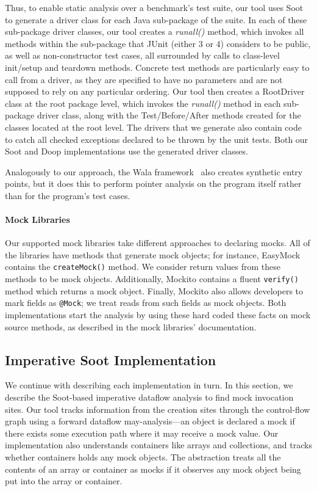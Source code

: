 Thus, to enable static analysis over a benchmark's test suite, our tool uses Soot to generate a driver class for each Java sub-package of the suite. In each of these sub-package driver classes, our tool creates a \textit{runall()} method, which invokes all methods within the sub-package that JUnit (either 3 or 4) considers to be public, as well as non-constructor test cases, all surrounded by calls to class-level init/setup and teardown methods. Concrete test methods are particularly easy to call from a driver, as they are specified to have no parameters and are not supposed to rely on any particular ordering. 
Our tool then creates a RootDriver class at the root package level, which invokes the \textit{runall()} method in each sub-package driver class, along with the Test/Before/After methods created for the classes located at the root level. The drivers that we generate also contain code to catch all checked exceptions declared to be thrown by the unit tests. Both our Soot and Doop implementations use the generated driver classes.

Analogously to our approach, the Wala framework~\cite{wala19:_t} also creates synthetic entry points, but it does this to perform pointer analysis on the program itself rather than for the program's test cases.

\paragraph{Mock Libraries}
Our supported mock libraries take different approaches to declaring mocks. All of the libraries have methods that generate mock objects; for instance, EasyMock contains the \texttt{createMock()} method. We consider return values from these methods to be mock objects. Additionally, Mockito contains a fluent \texttt{verify()} method which returns a mock object. Finally, Mockito also allows developers to mark fields as \texttt{@Mock}; we treat reads from such fields as mock objects. Both implementations start the analysis by using these hard coded these facts on mock source methods, as described in the mock libraries' documentation. 

\subsection{Imperative Soot Implementation}
We continue with describing each implementation in turn. In this section, we describe the Soot-based imperative dataflow analysis to find mock invocation sites. Our tool tracks information from the creation sites through the control-flow graph using a forward dataflow may-analysis---an object is declared a mock if there exists some execution path where it may receive a mock value. Our implementation also understands containers like arrays and collections, and tracks whether containers holds any mock objects. The abstraction treats all the contents of an array or container as mocks if it observes any mock object being put into the array or container.

